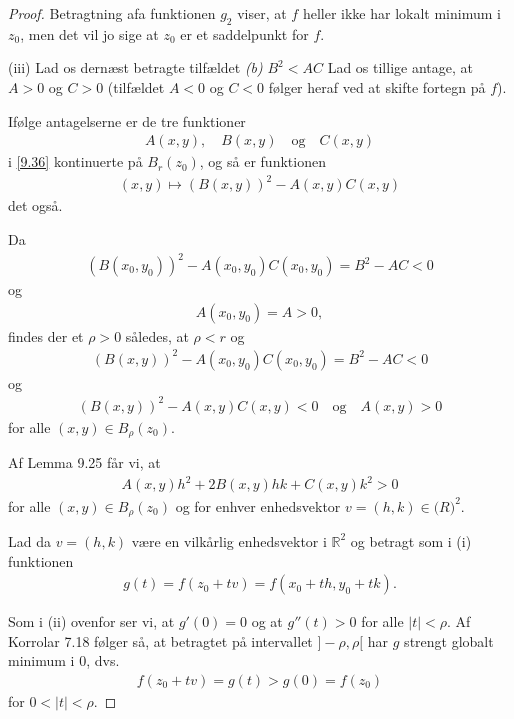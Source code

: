 \begin{proof}
  Betragtning afa funktionen $g_2$ viser, at $f$ heller ikke har lokalt minimum i $z_0$, men det vil jo sige at $z_0$ er et saddelpunkt for $f$.

  (iii) Lad os dernæst betragte tilfældet
  \textit{(b)} $B^2 < AC$
  Lad os tillige antage, at $A > 0$ og $C > 0$ (tilfældet $A < 0$ og $C < 0$ følger heraf ved at skifte fortegn på $f$).

  Ifølge antagelserne er de tre funktioner
  \begin{align*}
    A(x,y), \quad B(x,y) \quad \text{og} \quad C(x,y)
  \end{align*}
  i \eqref{9.36} kontinuerte på $B_r(z_0)$, og så er funktionen
  \begin{align*}
    (x, y) \mapsto (B(x,y))^2 - A(x,y)C(x,y)
  \end{align*}
  det også.

  Da
  \begin{align*}
    (B(x_0, y_0))^2 - A(x_0, y_0)C(x_0, y_0) = B^2 - AC < 0
  \end{align*}
  og
  \begin{align*}
    A(x_0, y_0) = A > 0,
  \end{align*}
  findes der et $\rho > 0$ således, at $\rho < r$ og
  \begin{align*}
    (B(x,y))^2 - A(x_0, y_0)C(x_0, y_0) = B^2 - AC < 0
  \end{align*}
  og
  \begin{align*}
    (B(x,y))^2 - A(x,y)C(x,y) < 0 \quad \text{og} \quad A(x,y) > 0
  \end{align*}
  for alle $(x,y) \in B_\rho(z_0)$.

  Af Lemma 9.25 får vi, at
  \begin{align*}
    A(x,y)h^2 + 2B(x,y)hk + C(x,y)k^2 > 0
  \end{align*}
  for alle $(x,y) \in B_\rho(z_0)$ og for enhver enhedsvektor $v = (h,k) \in \mathbb(R)^2$.

  Lad da $v = (h,k)$ være en vilkårlig enhedsvektor i $\mathbb{R}^2$ og betragt som i (i) funktionen
  \begin{align*}
    g(t) = f(z_0 + tv) = f(x_0 + th, y_0 + tk).
  \end{align*}

  Som i (ii) ovenfor ser vi, at $g'(0) = 0$ og at $g''(t) > 0$ for alle $|t| < \rho$. Af Korrolar 7.18 følger så, at betragtet på intervallet $]-\rho, \rho[$ har $g$ strengt globalt minimum i 0, dvs.
  \begin{align*}
    f(z_0 + tv) = g(t) > g(0) = f(z_0)
  \end{align*}
  for $0 < |t| < \rho$.


\end{proof}
